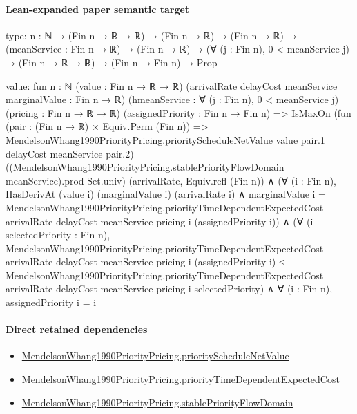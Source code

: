 \documentclass[10pt]{article}
\begin{document}
\paragraph{Lean-expanded paper semantic target}
\begin{ReviewVerbatim}
type:
{n : ℕ} →
  (Fin n → ℝ → ℝ) →
    (Fin n → ℝ) →
      (Fin n → ℝ) →
        (meanService : Fin n → ℝ) →
          (Fin n → ℝ) → (∀ (j : Fin n), 0 < meanService j) → (Fin n → ℝ → ℝ) → (Fin n → Fin n) → Prop

value:
fun {n : ℕ} (value : Fin n → ℝ → ℝ) (arrivalRate delayCost meanService marginalValue : Fin n → ℝ)
    (hmeanService : ∀ (j : Fin n), 0 < meanService j) (pricing : Fin n → ℝ → ℝ) (assignedPriority : Fin n → Fin n) =>
  IsMaxOn
      (fun (pair : (Fin n → ℝ) × Equiv.Perm (Fin n)) =>
        MendelsonWhang1990PriorityPricing.priorityScheduleNetValue value pair.1 delayCost meanService pair.2)
      ((MendelsonWhang1990PriorityPricing.stablePriorityFlowDomain meanService).prod Set.univ)
      (arrivalRate, Equiv.refl (Fin n)) ∧
    (∀ (i : Fin n),
        HasDerivAt (value i) (marginalValue i) (arrivalRate i) ∧
          marginalValue i =
            MendelsonWhang1990PriorityPricing.priorityTimeDependentExpectedCost arrivalRate delayCost meanService
              pricing i (assignedPriority i)) ∧
      (∀ (i selectedPriority : Fin n),
          MendelsonWhang1990PriorityPricing.priorityTimeDependentExpectedCost arrivalRate delayCost meanService pricing
              i (assignedPriority i) ≤
            MendelsonWhang1990PriorityPricing.priorityTimeDependentExpectedCost arrivalRate delayCost meanService
              pricing i selectedPriority) ∧
        ∀ (i : Fin n), assignedPriority i = i
\end{ReviewVerbatim}

\paragraph{Direct retained dependencies}
\begin{itemize}\raggedright
\item \hyperlink{governing-declaration-2d648b9cf4c8cf80}{Mendelson\allowbreak{}Whang1990\allowbreak{}Priority\allowbreak{}Pricing.\allowbreak{}priority\allowbreak{}Schedule\allowbreak{}Net\allowbreak{}Value}
\item \hyperlink{paper-prerequisite-476808203e3008c1}{Mendelson\allowbreak{}Whang1990\allowbreak{}Priority\allowbreak{}Pricing.\allowbreak{}priority\allowbreak{}Time\allowbreak{}Dependent\allowbreak{}Expected\allowbreak{}Cost}
\item \hyperlink{paper-prerequisite-84dca75fd93aa845}{Mendelson\allowbreak{}Whang1990\allowbreak{}Priority\allowbreak{}Pricing.\allowbreak{}stable\allowbreak{}Priority\allowbreak{}Flow\allowbreak{}Domain}
\end{itemize}
\end{document}
